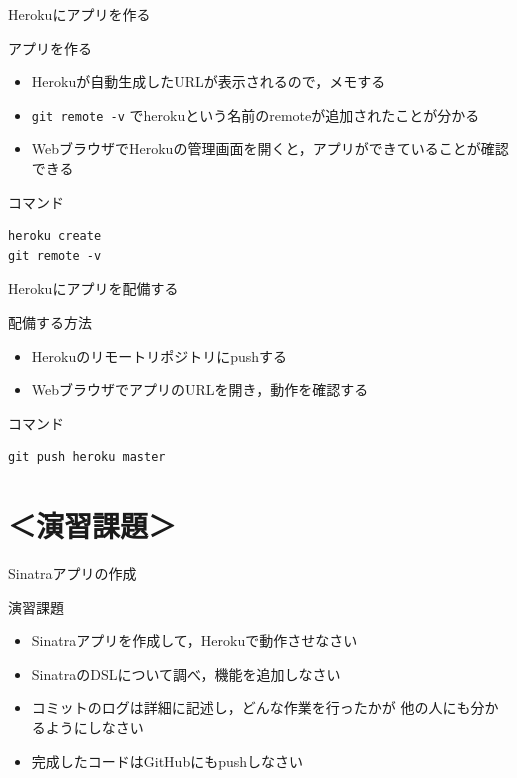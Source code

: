 \documentclass[t, aspectratio=169]{beamer}
\begin{document}
\begin{frame}[fragile,label=sec-5-2-5]{Herokuにアプリを作る}
 \begin{block}{アプリを作る}
\begin{itemize}
\item Herokuが自動生成したURLが表示されるので，メモする
\item \texttt{git remote -v} でherokuという名前のremoteが追加されたことが分かる
\item WebブラウザでHerokuの管理画面を開くと，アプリができていることが確認できる
\end{itemize}
\end{block}
\begin{block}{コマンド}
\begin{verbatim}
heroku create
git remote -v
\end{verbatim}
\end{block}
\end{frame}
\begin{frame}[fragile,label=sec-5-2-6]{Herokuにアプリを配備する}
 \begin{block}{配備する方法}
\begin{itemize}
\item Herokuのリモートリポジトリにpushする
\item WebブラウザでアプリのURLを開き，動作を確認する
\end{itemize}
\end{block}

\begin{block}{コマンド}
\begin{verbatim}
git push heroku master
\end{verbatim}
\end{block}
\end{frame}
\section{＜演習課題＞}
\label{sec-5-3}
\begin{frame}[label=sec-5-3-1]{Sinatraアプリの作成}
\begin{block}{演習課題}
\begin{itemize}
\item Sinatraアプリを作成して，Herokuで動作させなさい
\item SinatraのDSLについて調べ，機能を追加しなさい
\item コミットのログは詳細に記述し，どんな作業を行ったかが
他の人にも分かるようにしなさい
\item 完成したコードはGitHubにもpushしなさい
\end{itemize}
\end{block}
\end{frame}
\end{document}
